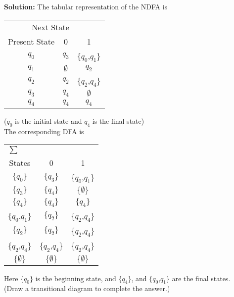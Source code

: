 \documentclass{beamer}
\begin{document}
\begin{frame}

\textbf{Solution:} The tabular representation of the NDFA is

\begin{center}

\begin{tabular}{ccc}
\toprule
\multicolumn{2}{r}{Next State} \\
\cmidrule(r){2-3}
 Present State & 0 & 1 \\
    \midrule
    ${q}_{0}$ & ${q}_{3}$ & $\{{q}_{0}$,${q}_{1}\}$ \\
    ${q}_{1}$ & $\emptyset$ & ${q}_{2}$\\
    ${q}_{2}$& ${q}_{2}$ & $\{{q}_{2}$,${q}_{4}\}$ \\
    ${q}_{3}$ & ${q}_{4}$ & $\emptyset$ \\
    ${q}_{4}$& ${q}_{4}$ & ${q}_{4}$\\

    \bottomrule


\end{tabular}

\end{center}


\end{frame}

\begin{frame}

(${q}_{0}$ is the initial state and ${q}_{4}$ is the final state)\\
The corresponding DFA is

\begin{center}

\begin{tabular}{ccc}


\toprule
\multicolumn{3}{l}{$\sum$} \\
\cmidrule(r){1-1}
 States & 0 & 1 \\
    \midrule
    $\{{q}_{0}\}$ & $\{{q}_{3}\}$ & $\{{q}_{0}$,${q}_{1}\}$ \\
    $\{{q}_{3}\}$ & $\{{q}_{4}\}$ & $\{\emptyset\}$\\
    $\{{q}_{4}\}$& $\{{q}_{4}\}$ & $\{{q}_{4}\}$ \\
    $\{{q}_{0}$,${q}_{1}\}$ & $\{{q}_{2}\}$ & $\{{q}_{2}$,${q}_{4}\}$ \\
    $\{{q}_{2}\}$ & $\{{q}_{2}\}$ & $\{{q}_{2}$,${q}_{4}\}$ \\
    $\{{q}_{2}$,${q}_{4}\}$ & $\{{q}_{2}$,${q}_{4}\}$ & $\{{q}_{2}$,${q}_{4}\}$ \\
    $\{\emptyset\}$ & $\{\emptyset\}$ & $\{\emptyset\}$\\
    \bottomrule


\end{tabular}

\end{center}

Here $\{{q}_{0}\}$ is the beginning state, and $\{{q}_{4}\}$, and $\{{q}_{0}$,${q}_{1}\}$ are the final states.\\
(Draw a transitional diagram to complete the answer.)\\

\end{frame}
\end{document}

